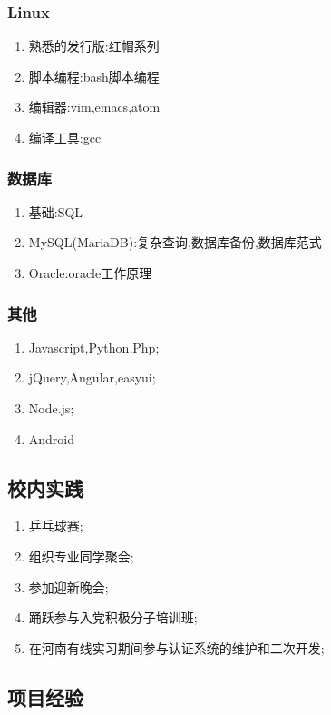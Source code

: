 \documentclass[11pt]{ctexart}
\begin{document}
\subsubsection{Linux}
\label{sec-1-2-2}
\begin{enumerate}
\item 熟悉的发行版:红帽系列
\item 脚本编程:bash脚本编程
\item 编辑器:vim,emacs,atom
\item 编译工具:gcc
\end{enumerate}
\subsubsection{数据库}
\label{sec-1-2-3}
\begin{enumerate}
\item 基础:SQL
\item MySQL(MariaDB):复杂查询,数据库备份,数据库范式
\item Oracle:oracle工作原理
\end{enumerate}
\subsubsection{其他}
\label{sec-1-2-4}
\begin{enumerate}
\item Javascript,Python,Php;
\item jQuery,Angular,easyui;
\item Node.js;
\item Android
\end{enumerate}
\subsection{校内实践}
\label{sec-1-3}
\begin{enumerate}
\item 乒乓球赛;
\item 组织专业同学聚会;
\item 参加迎新晚会;
\item 踊跃参与入党积极分子培训班;
\item 在河南有线实习期间参与认证系统的维护和二次开发;
\end{enumerate}
\subsection{项目经验}
\label{sec-1-4}
\end{document}
